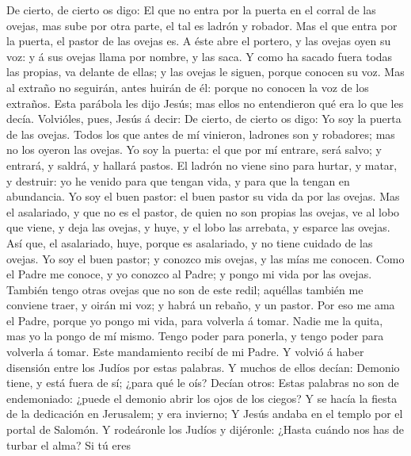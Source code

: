  De cierto, de cierto os digo: El que no entra por la
puerta en el corral de las ovejas, mas sube por otra parte, el tal es
ladrón y robador.  Mas el que entra por la puerta, el
pastor de las ovejas es.  A éste abre el portero, y las
ovejas oyen su voz: y á sus ovejas llama por nombre, y las saca.
 Y como ha sacado fuera todas las propias, va delante de
ellas; y las ovejas le siguen, porque conocen su voz.  Mas
al extraño no seguirán, antes huirán de él: porque no conocen la voz de
los extraños.  Esta parábola les dijo Jesús; mas ellos no
entendieron qué era lo que les decía.  Volvióles, pues,
Jesús á decir: De cierto, de cierto os digo: Yo soy la puerta de las
ovejas.  Todos los que antes de mí vinieron, ladrones son
y robadores; mas no los oyeron las ovejas.  Yo soy la
puerta: el que por mí entrare, será salvo; y entrará, y saldrá, y
hallará pastos.  El ladrón no viene sino para hurtar, y
matar, y destruir: yo he venido para que tengan vida, y para que la
tengan en abundancia.  Yo soy el buen pastor: el buen
pastor su vida da por las ovejas.  Mas el asalariado, y
que no es el pastor, de quien no son propias las ovejas, ve al lobo que
viene, y deja las ovejas, y huye, y el lobo las arrebata, y esparce las
ovejas.  Así que, el asalariado, huye, porque es
asalariado, y no tiene cuidado de las ovejas.  Yo soy el
buen pastor; y conozco mis ovejas, y las mías me conocen.
 Como el Padre me conoce, y yo conozco al Padre; y pongo
mi vida por las ovejas.  También tengo otras ovejas que
no son de este redil; aquéllas también me conviene traer, y oirán mi
voz; y habrá un rebaño, y un pastor.  Por eso me ama el
Padre, porque yo pongo mi vida, para volverla á tomar. 
Nadie me la quita, mas yo la pongo de mí mismo. Tengo poder para
ponerla, y tengo poder para volverla á tomar. Este mandamiento recibí de
mi Padre.  Y volvió á haber disensión entre los Judíos
por estas palabras.  Y muchos de ellos decían: Demonio
tiene, y está fuera de sí; ¿para qué le oís?  Decían
otros: Estas palabras no son de endemoniado: ¿puede el demonio abrir los
ojos de los ciegos?  Y se hacía la fiesta de la
dedicación en Jerusalem; y era invierno;  Y Jesús andaba
en el templo por el portal de Salomón.  Y rodeáronle los
Judíos y dijéronle: ¿Hasta cuándo nos has de turbar el alma? Si tú eres
